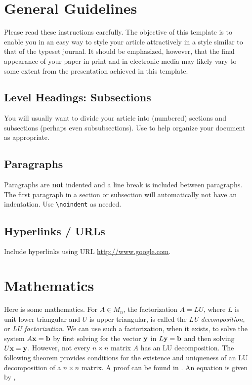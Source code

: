 \section{General Guidelines}

\noindent Please read these instructions carefully.   The objective of this template is to enable you in an easy way to style your article attractively in a style similar to that of the typeset journal. It should be emphasized, however, that the final appearance of your paper in print and in electronic media may likely vary to some extent from the presentation achieved in this template.


\subsection{Level Headings: Subsections}
\noindent You will usually want to divide your article into (numbered) sections and subsections (perhaps even subsubsections).  Use to help organize your document as appropriate.


\subsection{Paragraphs}
\noindent Paragraphs are \textbf{not} indented and a line break is included between paragraphs.  The first paragraph in a section or subsection will automatically  not  have an indentation.  Use \verb!\noindent! as needed.  


\subsection{Hyperlinks / URLs} 
Include hyperlinks using  URL \url{http://www.google.com}.  


\section{Mathematics}\label{sec:lu}
Here is some mathematics.  For $A \in M_n$, the factorization $A = LU$, where $L$ is unit lower triangular and $U$ is upper triangular,  is called the \textit{LU decomposition}, or \textit{LU factorization}.  We can use such a factorization, when it exists, to solve the system $A {\bf x} = {\bf b}$ by first solving for the vector $\bf{y}$ in $L {\bf y} = {\bf b}$ 
and then solving 
$
U {\bf x} = {\bf y}
$. 
However, not every $n \times n$ matrix $A$ has an LU decomposition.  The following theorem provides conditions for the existence and uniqueness of an LU decomposition of a $n \times n$ matrix.  A proof can be found in \citet[p. 160]{johnson1985matrix}.  An equation is given by \cite{strang1993introduction}, 

